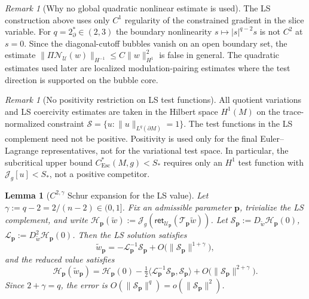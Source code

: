 \documentclass[11pt,reqno,a4paper]{amsart}
\numberwithin{equation}{section}
\theoremstyle{plain}
\newtheorem{lemma}[theorem]{Lemma}
\theoremstyle{remark}
\newtheorem{remark}[theorem]{Remark}
\theoremstyle{plain}
\begin{document}
\begin{remark}[Why no global quadratic nonlinear estimate is used]
\label{rem:no-global-quadratic-NLS}
The LS construction above uses only $C^1$ regularity of the constrained
gradient in the slice variable.  For $q=2_\partial^\ast\in(2,3)$ the boundary
nonlinearity $s\mapsto|s|^{q-2}s$ is not $C^2$ at $s=0$.  Since the
diagonal-cutoff bubbles vanish on an open boundary set, the estimate
$\|\Pi\mathcal N_{\mathcal U}(w)\|_{H^{-1}}\le C\|w\|_{H^1}^2$ is false in
general.  The quadratic estimates used later are localized
modulation-pairing estimates where the test direction is supported on the
bubble core.
\end{remark}


\begin{remark}[No positivity restriction on LS test functions]
\label{rem:LS-positivity-not-required}
All quotient variations and LS coercivity estimates are taken in the Hilbert
space $H^1(M)$ on the trace-normalized constraint
$\mathcal S=\{u:\|u\|_{L^q(\partial M)}=1\}$.
The test functions in the LS complement need not be positive.  Positivity is
used only for the final Euler--Lagrange representatives, not for the
variational test space.  In particular, the subcritical upper bound
$C_{\mathrm{Esc}}^*(M,g)<S_\ast$ requires only an $H^1$ test function with
$\mathcal J_g[u]<S_\ast$, not a positive competitor.
\end{remark}

\begin{lemma}[$C^{2,\gamma}$ Schur expansion for the LS value]
\label{lem:holder-schur-expansion}
Let $\gamma:=q-2=2/(n-2)\in(0,1]$.
Fix an admissible parameter $\mathbf p$, trivialize the LS complement,
and write $\mathscr H_{\mathbf p}(\tilde w):=\mathcal J_g(\mathsf{ret}_{\mathcal U_{\mathbf p}}(\mathcal T_{\mathbf p}\tilde w))$.
Let $\mathcal S_{\mathbf p}:=D_{\tilde w}\mathscr H_{\mathbf p}(0)$,
$\mathcal L_{\mathbf p}:=D^2_{\tilde w}\mathscr H_{\mathbf p}(0)$.
Then the LS solution satisfies
\begin{equation}\label{eq:holder-w-schur}
\tilde w_{\mathbf p}
=-\mathcal L_{\mathbf p}^{-1}\mathcal S_{\mathbf p}
+O\bigl(\|\mathcal S_{\mathbf p}\|^{1+\gamma}\bigr),
\end{equation}
and the reduced value satisfies
\begin{equation}\label{eq:holder-energy-schur}
\mathscr H_{\mathbf p}(\tilde w_{\mathbf p})
=\mathscr H_{\mathbf p}(0)
-\tfrac12\langle\mathcal L_{\mathbf p}^{-1}\mathcal S_{\mathbf p},
\mathcal S_{\mathbf p}\rangle
+O\bigl(\|\mathcal S_{\mathbf p}\|^{2+\gamma}\bigr).
\end{equation}
Since $2+\gamma=q$, the error is $O(\|\mathcal S_{\mathbf p}\|^q)=o(\|\mathcal S_{\mathbf p}\|^2)$.
\end{lemma}
\end{document}
